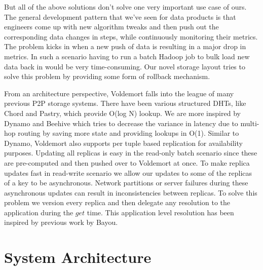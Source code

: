 \documentclass[10pt,twocolumn,preprint,natbib,authoryear]{sigplanconf}
\begin{document}
But all of the above solutions don't solve one very important use case of ours. The general development pattern that we've seen for data products is that engineers come up with new algorithm tweaks and then push out the corresponding data changes in steps, while continuously monitoring their metrics. The problem kicks in when a new push of data is resulting in a major drop in metrics. In such a scenario having to run a batch Hadoop job to bulk load new data back in would be very time-consuming. Our novel storage layout tries to solve this problem by providing some form of rollback mechanism. 
 
From an architecture perspective, Voldemort falls into the league of many previous P2P storage systems. There have been various structured DHTs, like Chord\cite{chord} and Pastry\cite{pastry}, which provide O(log N) lookup. We are more inspired by Dynamo and Beehive\cite{beehive} which tries to decrease the variance in latency due to multi-hop routing by saving more state and providing lookups in O(1). Similar to Dynamo, Voldemort also supports per tuple based replication for availability purposes. Updating all replicas is easy in the read-only batch scenario since these are pre-computed and then pushed over to Voldemort at once. To make replica updates fast in read-write scenario we allow our updates to some of the replicas of a key to be asynchronous. Network partitions or server failures during these asynchronous updates can result in inconsistencies between replicas. To solve this problem we version every replica and then delegate any resolution to the application during the $get$ time. This application level resolution has been inspired by previous work by Bayou\cite{bayou}. 


\section{System Architecture}
\label{sec:system_architecture}
\end{document}
